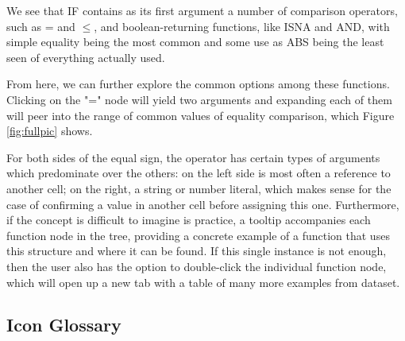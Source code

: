 \documentclass[conference]{IEEEtran}
\begin{document}
	We see that IF contains as its first argument a number of
	comparison operators, such as = and $\le$, and boolean-returning functions, like
	ISNA and AND, with simple equality being the most common and some use as ABS
	being the least seen of everything actually used. \par
	
	From here, we can further explore the common options among these functions.
	Clicking on the "=" node will yield two arguments
	and expanding each of them will peer into the range of common values of
	equality comparison, which Figure \ref{fig:fullpic} shows. \par 
	
	For both sides of the equal sign, the operator has certain types of arguments
	which predominate over the others: on the left side is most often a reference
	to another cell; on the right, a string or number literal, which makes sense
	for the case of confirming a value in another cell before assigning this one.
	Furthermore, if the concept is difficult to imagine is practice, a tooltip
	accompanies each function node in the tree, providing a concrete example of a
	function that uses this structure and where it can be found. If this single
	instance is not enough, then the user also has the option to double-click the
	individual function node, which will open up a new tab with a table of many
	more examples from dataset.
	
	\subsection{Icon Glossary} 
	
\end{document}
